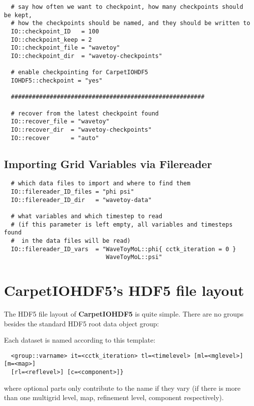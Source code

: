 \documentclass{article}
\begin{document}
\begin{verbatim}
  # say how often we want to checkpoint, how many checkpoints should be kept,
  # how the checkpoints should be named, and they should be written to
  IO::checkpoint_ID   = 100
  IO::checkpoint_keep = 2
  IO::checkpoint_file = "wavetoy"
  IO::checkpoint_dir  = "wavetoy-checkpoints"

  # enable checkpointing for CarpetIOHDF5
  IOHDF5::checkpoint = "yes"

  #######################################################

  # recover from the latest checkpoint found
  IO::recover_file = "wavetoy"
  IO::recover_dir  = "wavetoy-checkpoints"
  IO::recover      = "auto"
\end{verbatim}

\subsection{Importing Grid Variables via Filereader}

\begin{verbatim}
  # which data files to import and where to find them
  IO::filereader_ID_files = "phi psi"
  IO::filereader_ID_dir   = "wavetoy-data"

  # what variables and which timestep to read
  # (if this parameter is left empty, all variables and timesteps found
  #  in the data files will be read)
  IO::filereader_ID_vars  = "WaveToyMoL::phi{ cctk_iteration = 0 }
                             WaveToyMoL::psi"
\end{verbatim}


\iffalse
\section{CarpetIOHDF5's HDF5 file layout}

The HDF5 file layout of {\bf CarpetIOHDF5} is quite simple.
There are no groups besides the standard HDF5 root data object group:

Each dataset is named according to this template:

\begin{verbatim}
  <group::varname> it=<cctk_iteration> tl=<timelevel> [ml=<mglevel>] [m=<map>]
  [rl=<reflevel>] [c=<component>]}
\end{verbatim}

where optional parts only contribute to the name if they vary (if there is
more than one multigrid level, map, refinement level, component respectively).
\end{document}
